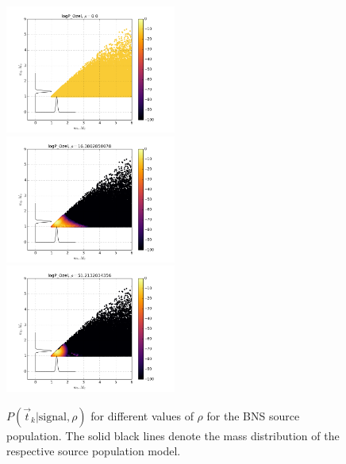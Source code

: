\documentclass[twocolumn,showpacs,unsortedaddress,superscriptaddress,showkeys,nofootinbib,preprintnumbers,letterpaper]{revtex4-1}
\begin{document}
\begin{figure}
\includegraphics[width=0.5\textwidth]{logP_Ozelrho0_0.png}
\includegraphics[width=0.5\textwidth]{logP_Ozelrho16_3802850078.png}
\includegraphics[width=0.5\textwidth]{logP_Ozelrho51_2132034356.png}
\caption{$P(\vec{t}_k|\text{signal},\rho)$ for different values of $\rho$ for the BNS source population. The solid black lines denote the mass distribution of the respective source population model.}
\end{figure}
\end{document}
